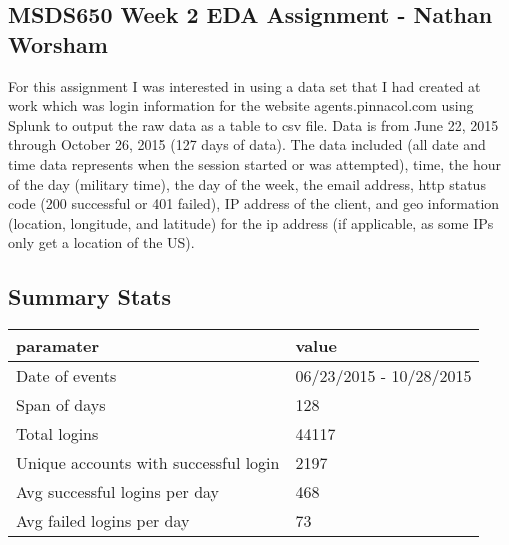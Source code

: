 \documentclass[10pt]{article}
\begin{document}
\subsection*{MSDS650 Week 2 EDA Assignment - Nathan Worsham}
For this assignment I was interested in using a data set that I had created at work which was login information for the website agents.pinnacol.com using Splunk to output the raw data as a table to csv file.
Data is from June 22, 2015 through October 26, 2015 (127 days of data).
The data included (all date and time data represents when the session started or was attempted), time, the hour of the day (military time), the day of the week, the email address, http status code (200 successful or 401 failed), IP address of the client, and geo information (location, longitude, and latitude) for the ip address (if applicable, as some IPs only get a location of the US).
\subsection*{Summary Stats}
\begin{table}[h!]
  \begin{center}
    \scriptsize
    \begin{tabular}{ll}
      \toprule
      paramater & value\\
      \midrule
Date of events & 06/23/2015 - 10/28/2015\\
Span of days & 128\\
Total logins & 44117\\
Unique accounts with successful login & 2197\\
Avg successful logins per day & 468\\
Avg failed logins per day & 73\\
\bottomrule
    \end{tabular}
  \end{center}
\end{table}
\end{document}
